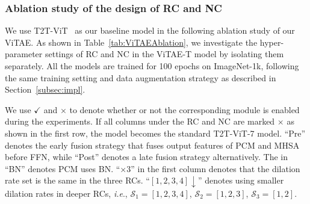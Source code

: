 \documentclass[twocolumn]{svjour3}          \smartqed  \usepackage{natbib}
\newcommand{\ie}{i.e}
\def\onedot{.\xspace}
\def\ie{\emph{i.e}\onedot}
\begin{document}
\subsubsection{Ablation study of the design of RC and NC}
We use T2T-ViT~\citep{yuan2021tokens} as our baseline model in the following ablation study of our ViTAE. As shown in Table~\ref{tab:ViTAEAblation}, we investigate the hyper-parameter settings of RC and NC in the ViTAE-T model by isolating them separately. All the models are trained for 100 epochs on ImageNet-1k, following the same training setting and data augmentation strategy as described in Section~\ref{subsec:impl}.

We use $\checkmark$ and $\times$ to denote whether or not the corresponding module is enabled during the experiments. If all columns under the RC and NC are marked $\times$ as shown in the first row, the model becomes the standard T2T-ViT-7 model. ``Pre'' denotes the early fusion strategy that fuses output features of PCM and MHSA before FFN, while ``Post'' denotes a late fusion strategy alternatively. The \checkmark in ``BN'' denotes PCM uses BN. ``$\times 3$'' in the first column denotes that the dilation rate set is the same in the three RCs. ``$[1,2,3,4] \downarrow$'' denotes using smaller dilation rates in deeper RCs, \ie, $\mathcal{S}_1=[1,2,3,4]$, $\mathcal{S}_2=[1,2,3]$, $\mathcal{S}_3=[1,2]$.
\end{document}

